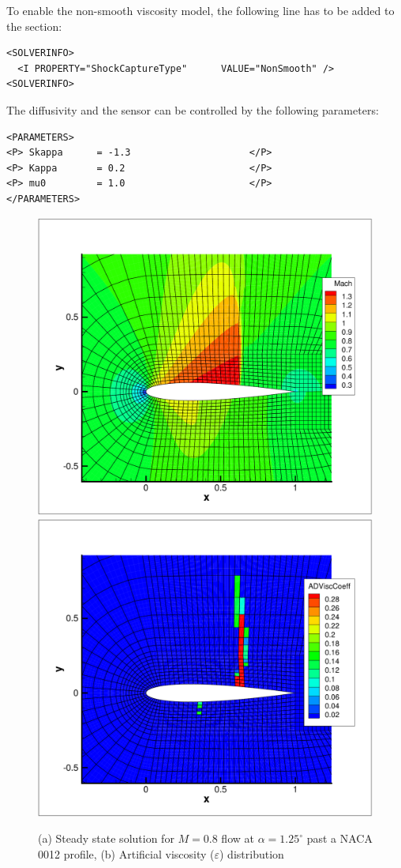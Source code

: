 To enable the non-smooth viscosity model, the following line has to be added to the  section:
\begin{lstlisting}[style=XmlStyle]
<SOLVERINFO>
  <I PROPERTY="ShockCaptureType"      VALUE="NonSmooth" />
<SOLVERINFO>
\end{lstlisting}
The diffusivity and the sensor can be controlled by the following parameters:
\begin{lstlisting}[style=XmlStyle]
<PARAMETERS>
<P> Skappa 	 	= -1.3                     </P>
<P> Kappa 	 	= 0.2                      </P>
<P> mu0 	  	= 1.0                      </P>
</PARAMETERS>
\end{lstlisting}

\begin{figure}[!htbp]
\begin{center}
\includegraphics[width = 0.47 \textwidth]{img/Mach_P4.pdf}
\includegraphics[width = 0.47 \textwidth]{img/ArtVisc_P4.pdf}
\caption{(a) Steady state solution for $M=0.8$ flow at $\alpha = 1.25^\circ$ past a NACA 0012 profile, (b) Artificial viscosity ($\varepsilon$) distribution}
\label{fig:}
\end{center}
\end{figure}

